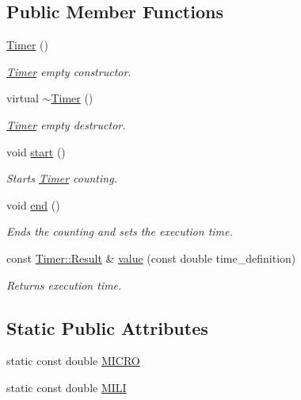 \subsection*{Public Member Functions}
\begin{DoxyCompactItemize}
\item 
\hyperlink{classTimer_a5f16e8da27d2a5a5242dead46de05d97}{Timer} ()
\begin{DoxyCompactList}\small\item\em \hyperlink{classTimer}{Timer} empty constructor. \end{DoxyCompactList}\item 
virtual \hyperlink{classTimer_ad3c95ce902fce977d280256256856d64}{$\sim$\-Timer} ()
\begin{DoxyCompactList}\small\item\em \hyperlink{classTimer}{Timer} empty destructor. \end{DoxyCompactList}\item 
void \hyperlink{classTimer_a3a8b5272198d029779dc9302a54305a8}{start} ()
\begin{DoxyCompactList}\small\item\em Starts \hyperlink{classTimer}{Timer} counting. \end{DoxyCompactList}\item 
void \hyperlink{classTimer_accef2f2b25869fbca2947a56b494d2a0}{end} ()
\begin{DoxyCompactList}\small\item\em Ends the counting and sets the execution time. \end{DoxyCompactList}\item 
const \hyperlink{classTimer_1_1Result}{Timer\-::\-Result} \& \hyperlink{classTimer_a8a8f26ec48ce04dc4b87b88b6e789fea}{value} (const double time\-\_\-definition)
\begin{DoxyCompactList}\small\item\em Returns execution time. \end{DoxyCompactList}\end{DoxyCompactItemize}
\subsection*{Static Public Attributes}
\begin{DoxyCompactItemize}
\item 
static const double \hyperlink{classTimer_a34f60ca96ff5a7f7e1f9c808642c102d}{M\-I\-C\-R\-O}
\item 
static const double \hyperlink{classTimer_a6dc3788aafa58a3b9449a5ca37c780bf}{M\-I\-L\-I}
\end{DoxyCompactItemize}



